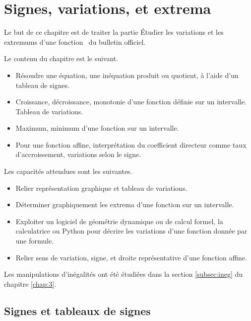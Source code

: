 
\chapter{Signes, variations, et extrema}

Le but de ce chapitre est de traiter la partie \og Étudier les variations et les extremums d'une fonction \fg~du bulletin officiel.

Le contenu du chapitre est le suivant.
	\begin{itemize}
		\item Résoudre une équation, une inéquation produit ou quotient, à l'aide d'un tableau de signes.
		\item Croissance, décroissance, monotonie d'une fonction définie sur un intervalle. Tableau de variations.
		\item Maximum, minimum d'une fonction sur un intervalle.
		\item Pour une fonction affine, interprétation du coefficient directeur comme taux d'accroissement, variations selon le signe.
	\end{itemize}

Les capacités attendues sont les suivantes.
	\begin{itemize}
		\item Relier représentation graphique et tableau de variations.
		\item Déterminer graphiquement les extrema d'une fonction sur un intervalle.
		\item Exploiter un logiciel de géométrie dynamique ou de calcul formel, la calculatrice ou Python pour décrire les variations d'une fonction donnée par une formule.
		\item Relier sens de variation, signe, et droite représentative d'une fonction affine.
	\end{itemize}
	

Les manipulations d'inégalités ont été étudiées dans la section \ref{subsec:ineg} du chapitre \ref{chap:3}.

\section{Signes et tableaux de signes}


